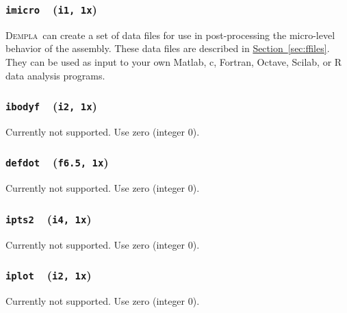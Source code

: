 \documentclass[letterpaper,11pt]{article}
\newcommand{\Oval}{\textsc{Oval}}
\newcommand{\OvalPlot}{\textsc{OvalPlot}}
\newcommand{\Dempla}{\textsc{Dempla}}
\newcommand{\Var}[2]{\texttt{#1}\ \  (\texttt{#2})}
\newcommand{\RunFile}{\textsf{RunFile}}
\begin{document}
%
\subsubsection[\texttt{imicro}]{\Var{imicro}{i1, 1x}}\label{sec:imicro}
\Dempla\ can create a set of data files 
for use in post-processing the micro-level behavior of the assembly.
These data files are described in
\hyperref[sec:ffiles]{Section~\ref*{sec:ffiles}}.
They can be used as input to your own Matlab, c, Fortran, Octave, Scilab, or R
data analysis programs.
%
\subsubsection[\texttt{ibodyf}]{\Var{ibodyf}{i2, 1x}}
Currently not supported.  
Use zero (integer 0).
%
\subsubsection[\texttt{defdot}]{\Var{defdot}{f6.5, 1x}}
Currently not supported.
Use zero (integer 0).
%
\subsubsection[\texttt{ipts2}]{\Var{ipts2}{i4, 1x}}
Currently not supported.
Use zero (integer 0).
%
\subsubsection[\texttt{iplot}]{\Var{iplot}{i2, 1x}}\label{sec:iplot}
Currently not supported.
Use zero (integer 0).
%
\end{document}
